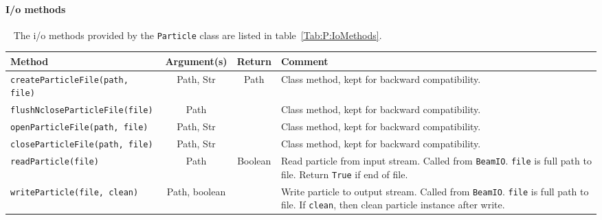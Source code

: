 \paragraph{I/o methods} ~\newline
\noindent
The i/o methods provided by the \texttt{Particle} class are listed in
table~\ref{Tab:P:IoMethods}.
\begin{sidewaystable}[h]
  \caption{
    I/o methods provided by the \texttt{Particle} class. 
  }
  \label{Tab:P:IoMethods}
  \begin{center}
    \begin{tabular}{|l|c|c|p{10cm}|}
      \hline
      \textbf{Method} & \textbf{Argument(s)} & \textbf{Return} & \textbf{Comment}                                          \\
      \hline
      \texttt{createParticleFile(path, file)} & Path, Str & Path    & Class method, kept for backward compatibility.          \\
      \texttt{flushNcloseParticleFile(file)}  & Path      &         & Class method, kept for backward compatibility.          \\
      \texttt{openParticleFile(path, file)}   & Path, Str &         & Class method, kept for backward compatibility.          \\
      \texttt{closeParticleFile(path, file)}  & Path, Str &         & Class method, kept for backward compatibility.          \\
      \texttt{readParticle(file)}             & Path      & Boolean & Read particle from input stream.  Called from \texttt{BeamIO}.
                                                                   \texttt{file} is full path to file. Return \texttt{True} if end
                                                                   of file.                                                   \\
      \texttt{writeParticle(file, clean)} & Path, boolean &      & Write particle to output stream.  Called from \texttt{BeamIO}.
                                                                   \texttt{file} is full path to file. If \texttt{clean}, then
                                                                   clean particle instance after write.                    \\
      
      \hline
    \end{tabular}
  \end{center}
\end{sidewaystable}


